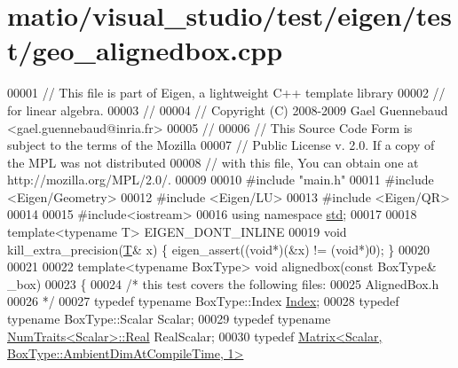 \hypertarget{matio_2visual__studio_2test_2eigen_2test_2geo__alignedbox_8cpp_source}{}\section{matio/visual\+\_\+studio/test/eigen/test/geo\+\_\+alignedbox.cpp}
\label{matio_2visual__studio_2test_2eigen_2test_2geo__alignedbox_8cpp_source}

\begin{DoxyCode}
00001 \textcolor{comment}{// This file is part of Eigen, a lightweight C++ template library}
00002 \textcolor{comment}{// for linear algebra.}
00003 \textcolor{comment}{//}
00004 \textcolor{comment}{// Copyright (C) 2008-2009 Gael Guennebaud <gael.guennebaud@inria.fr>}
00005 \textcolor{comment}{//}
00006 \textcolor{comment}{// This Source Code Form is subject to the terms of the Mozilla}
00007 \textcolor{comment}{// Public License v. 2.0. If a copy of the MPL was not distributed}
00008 \textcolor{comment}{// with this file, You can obtain one at http://mozilla.org/MPL/2.0/.}
00009 
00010 \textcolor{preprocessor}{#include "main.h"}
00011 \textcolor{preprocessor}{#include <Eigen/Geometry>}
00012 \textcolor{preprocessor}{#include <Eigen/LU>}
00013 \textcolor{preprocessor}{#include <Eigen/QR>}
00014 
00015 \textcolor{preprocessor}{#include<iostream>}
00016 \textcolor{keyword}{using namespace }\hyperlink{namespacestd}{std};
00017 
00018 \textcolor{keyword}{template}<\textcolor{keyword}{typename} T> EIGEN\_DONT\_INLINE
00019 \textcolor{keywordtype}{void} kill\_extra\_precision(\hyperlink{group___sparse_core___module}{T}& x) \{ eigen\_assert((\textcolor{keywordtype}{void}*)(&x) != (\textcolor{keywordtype}{void}*)0); \}
00020 
00021 
00022 \textcolor{keyword}{template}<\textcolor{keyword}{typename} BoxType> \textcolor{keywordtype}{void} alignedbox(\textcolor{keyword}{const} BoxType& \_box)
00023 \{
00024   \textcolor{comment}{/* this test covers the following files:}
00025 \textcolor{comment}{     AlignedBox.h}
00026 \textcolor{comment}{  */}
00027   \textcolor{keyword}{typedef} \textcolor{keyword}{typename} BoxType::Index \hyperlink{namespace_eigen_a62e77e0933482dafde8fe197d9a2cfde}{Index};  
00028   \textcolor{keyword}{typedef} \textcolor{keyword}{typename} BoxType::Scalar Scalar;
00029   \textcolor{keyword}{typedef} \textcolor{keyword}{typename} \hyperlink{group___core___module_struct_eigen_1_1_num_traits}{NumTraits<Scalar>::Real} RealScalar;
00030   \textcolor{keyword}{typedef} \hyperlink{group___core___module_class_eigen_1_1_matrix}{Matrix<Scalar, BoxType::AmbientDimAtCompileTime, 1>}

\end{DoxyCode}
